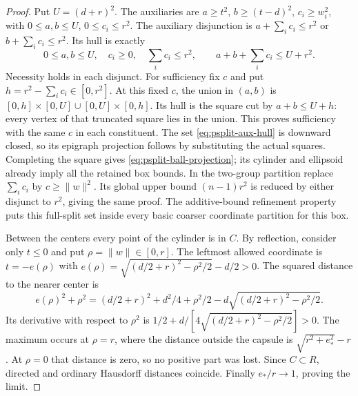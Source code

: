 \begin{proof}
Put $U=(d+r)^2$. The auxiliaries are $a\ge t^2$, $b\ge(t-d)^2$,
$c_i\ge w_i^2$, with $0\le a,b\le U$, $0\le c_i\le r^2$.
The auxiliary disjunction is $a+\sum_i c_i\le r^2$ or
$b+\sum_i c_i\le r^2$. Its hull is exactly
\begin{equation}\label{eq:psplit-aux-hull}
 0\le a,b\le U,\quad c_i\ge0,\quad\sum_i c_i\le r^2,
 \qquad a+b+\sum_i c_i\le U+r^2.
\end{equation}
Necessity holds in each disjunct. For sufficiency fix $c$ and put
$h=r^2-\sum_i c_i\in[0,r^2]$. At this fixed $c$, the union in $(a,b)$
is $[0,h]\times[0,U]\cup[0,U]\times[0,h]$. Its hull is the square
cut by $a+b\le U+h$: every vertex of that truncated square lies in
the union. This proves sufficiency with the same $c$ in each constituent.
The set \eqref{eq:psplit-aux-hull} is downward closed, so its epigraph
projection follows by substituting the actual squares. Completing the
square gives \eqref{eq:psplit-ball-projection}; its cylinder and ellipsoid
already imply all the retained box bounds. In the two-group partition
replace $\sum_i c_i$ by $c\ge\|w\|^2$. Its global upper bound
$(n-1)r^2$ is reduced by either disjunct to $r^2$, giving the same proof.
The additive-bound refinement property
\citep[Theorem 4 and Corollary 3]{KronqvistEtAl2026} puts this full-split
set inside every basic coarser coordinate partition for this box.

Between the centers every point of the cylinder is in $C$. By reflection,
consider only $t\le0$ and put $\rho=\|w\|\in[0,r]$. The leftmost allowed
coordinate is $t=-e(\rho)$ with
$e(\rho)=\sqrt{(d/2+r)^2-\rho^2/2}-d/2>0$.
The squared distance to the nearer center is
\[
 e(\rho)^2+\rho^2=(d/2+r)^2+d^2/4+\rho^2/2
                         -d\sqrt{(d/2+r)^2-\rho^2/2}.
\]
Its derivative with respect to $\rho^2$ is
$1/2+d/[4\sqrt{(d/2+r)^2-\rho^2/2}]>0$. The maximum occurs at
$\rho=r$, where the distance outside the capsule is
$\sqrt{r^2+e_*^2}-r$. At $\rho=0$ that distance is zero, so no positive
part was lost. Since $C\subset R$, directed and ordinary Hausdorff
distances coincide. Finally $e_*/r\to1$, proving the limit.
\end{proof}

